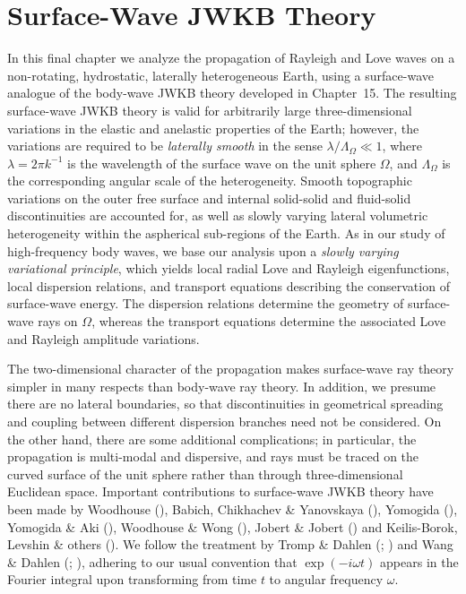 \chapter{Surface-Wave JWKB Theory}

In this final chapter we analyze the propagation of Rayleigh
and Love waves on a non-rotating, hydrostatic,
laterally heterogeneous Earth, using a
surface-wave analogue of the body-wave JWKB theory developed
in Chapter~15.  The resulting surface-wave JWKB theory is
valid for arbitrarily large three-dimensional variations in the elastic and
anelastic properties of the Earth; however, the variations are
required to be {\em laterally smooth\/} in the sense
%
$\lambda/\Lambda_{\Omega}\ll 1$,
where $\lambda=2\pi k^{-1}$ is the
wavelength of the surface wave on the
unit sphere $\Omega$, and $\Lambda_{\Omega}$
is the corresponding angular scale
of the heterogeneity.  Smooth topographic variations on the
outer free surface and internal solid-solid and
fluid-solid discontinuities are accounted for,
as well as slowly varying lateral volumetric
heterogeneity within the aspherical sub-regions of the Earth.
As in our study of high-frequency
body waves, we base our analysis upon a {\em slowly varying
variational principle\/}, which yields local radial Love and
Rayleigh eigenfunctions, local dispersion relations, and transport
equations describing the conservation of surface-wave energy.
The dispersion relations determine the geometry
of surface-wave rays on $\Omega$,
whereas the transport equations determine
the associated Love and Rayleigh amplitude variations.

\enlargethispage{-0.5\baselineskip}

The two-dimensional character of
the propagation makes surface-wave ray
theory simpler in many respects than body-wave ray theory.
In addition, we presume there are no lateral boundaries, so
that discontinuities in geometrical spreading and coupling
between different dispersion branches need not be considered.
On the other hand, there are some additional complications;
in particular, the propagation is multi-modal and dispersive,
and rays must be traced on the curved surface of the
unit sphere rather than through three-dimensional Euclidean space.
Important contributions to surface-wave JWKB theory have been made
by Woodhouse (\citeyear{woodhouse74}), Babich, Chikhachev
\& Yanovskaya (\citeyear{babich&al76}), Yomogida
(\citeyear{yomogida85}), Yomogida \& Aki (\citeyear{yomogida&aki85}),
Woodhouse \& Wong (\citeyear{woodhouse&wong86}),
Jobert \& Jobert (\citeyear{jobert&jobert87})
and Keilis-Borok, Levshin \& others (\citeyear{keilis-borok89}).
We follow the treatment by
Tromp \& Dahlen (\citeyear{tromp&dahlen92a};
\citeyear{tromp&dahlen92b})
and Wang \& Dahlen (\citeyear{wang&dahlen94};
\citeyear{wang&dahlen95}),
adhering to our usual convention that
$\exp(-i\omega t)$ appears in the Fourier
integral upon transforming from time
$t$ to angular frequency $\omega$.

